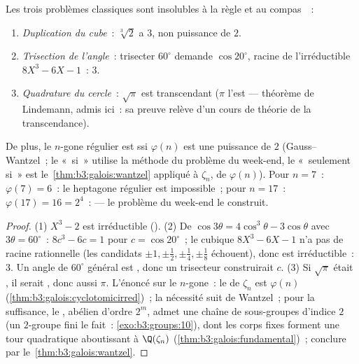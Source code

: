 \begin{corollary}\label{cor:b3:galois:impossible}
Les trois problèmes classiques sont insolubles à la règle et au
compas~~:
\begin{enumerate}
  \item \emph{Duplication du cube}~: $\sqrt[3]2$ a  $3$,
        non puissance de $2$.
  \item \emph{Trisection de l'angle}~: trisecter $60^\circ$
        demande $\cos 20^\circ$, racine de l'irréductible $8X^3
        - 6X - 1$~:  $3$.
  \item \emph{Quadrature du cercle}~: $\sqrt\pi$ est
        transcendant ($\pi$ l'est --- théorème de Lindemann,
        admis ici~: sa preuve relève d'un cours de théorie de
        la transcendance).
\end{enumerate}
De plus, le $n$-gone régulier est  ssi
$\varphi(n)$ est une puissance de $2$ (Gauss--Wantzel~; le
«~si~» utilise la méthode du problème du week-end, le «~seulement
si~» est le~\cref{thm:b3:galois:wantzel} appliqué à $\zeta_n$,
de  $\varphi(n)$). Pour $n = 7$~: $\varphi(7) = 6$~: le
heptagone régulier est impossible~; pour $n = 17$~: $\varphi(17)
= 16 = 2^4$~:  --- le problème du week-end le
construit.
\end{corollary}

\begin{proof}
(1) $X^3 - 2$ est irréductible (). (2) De $\cos
3\theta = 4\cos^3\theta - 3\cos\theta$ avec $3\theta =
60^\circ$~: $8c^3 - 6c = 1$ pour $c = \cos 20^\circ$~; le cubique
$8X^3 - 6X - 1$ n'a pas de racine rationnelle (les candidats
$\pm1, \pm\frac12, \pm\frac14, \pm\frac18$ échouent), donc est
irréductible~:  $3$. Un angle de $60^\circ$ général est
, donc un trisecteur construirait $c$. (3) Si
$\sqrt\pi$ était , il serait , donc aussi
$\pi$. L'énoncé sur le $n$-gone~: le  de $\zeta_n$ est
$\varphi(n)$ (\cref{thm:b3:galois:cyclotomicirred})~; la
nécessité suit de Wantzel~; pour la suffisance, le , abélien d'ordre $2^m$, admet une chaîne de sous-groupes
d'indice $2$ (un $2$-groupe fini le fait~:
\cref{exo:b3:groups:10}), dont les corps fixes forment une tour
quadratique aboutissant à $\Q(\zeta_n)$
(\cref{thm:b3:galois:fundamental})~; conclure par
le~\cref{thm:b3:galois:wantzel}.
\end{proof}

